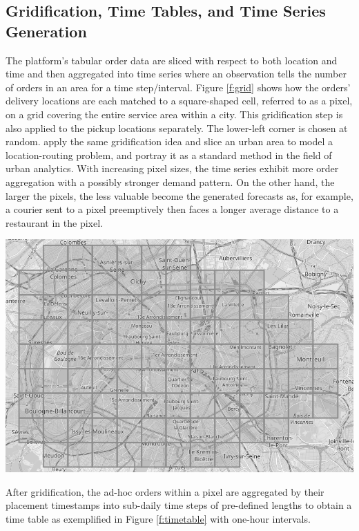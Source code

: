 \subsection{Gridification, Time Tables, and Time Series Generation}
\label{grid}

The platform's tabular order data are sliced with respect to both location and
    time and then aggregated into time series where an observation tells
    the number of orders in an area for a time step/interval.
Figure \ref{f:grid} shows how the orders' delivery locations are each
    matched to a square-shaped cell, referred to as a pixel, on a grid
    covering the entire service area within a city.
This gridification step is also applied to the pickup locations separately.
The lower-left corner is chosen at random.
\cite{winkenbach2015} apply the same gridification idea and slice an urban
    area to model a location-routing problem, and \cite{singleton2017} portray
    it as a standard method in the field of urban analytics.
With increasing pixel sizes, the time series exhibit more order aggregation
    with a possibly stronger demand pattern.
On the other hand, the larger the pixels, the less valuable become the
    generated forecasts as, for example, a courier sent to a pixel
    preemptively then faces a longer average distance to a restaurant in the
    pixel.

\begin{center}
\label{f:grid}
\includegraphics[width=.8\linewidth]{static/gridification_for_paris_gray.png}
\end{center}

After gridification, the ad-hoc orders within a pixel are aggregated by their
    placement timestamps into sub-daily time steps of pre-defined lengths
    to obtain a time table as exemplified in Figure \ref{f:timetable} with
    one-hour intervals.

